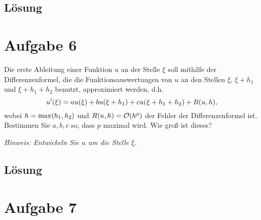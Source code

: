 \documentclass{exercise}
\begin{document}
    \subsection*{Lösung}


    \section*{Aufgabe 6}
    
    \begin{problem}
        Die erste Ableitung einer Funktion \(u\) an der Stelle \(\xi\) soll mithilfe der Differenzenformel, die die Funktionsauswertungen von \(u\) an den Stellen \(\xi\), \(\xi + h_1\) und \(\xi + h_1 + h_2\) benutzt, approximiert werden, d.h.
        \[
            u'\parentheses*{\xi} = au\parentheses*{\xi} + bu\parentheses*{\xi + h_1} + cu\parentheses*{\xi + h_1 + h_2} + R\parentheses*{u, h},
        \]
        wobei \(h = \max\parentheses*{h_1, h_2}\) und \(R\parentheses*{u, h} = \mathcal{O}\parentheses*{h^p}\) der Fehler der Differenzenformel ist.
        Bestimmen Sie \(a, b, c\) so, dass \(p\) maximal wird.
        Wie groß ist dieses?

        \emph{Hinweis: Entwickeln Sie \(u\) um die Stelle \(\xi\).}
    \end{problem}
    
    \subsection*{Lösung}


    \section*{Aufgabe 7}
    
\end{document}
